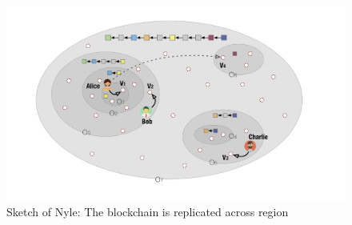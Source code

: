 \documentclass[a4paper,11pt,oneside]{report}
\begin{document}
\begin{figure}[!h]
\centering
\includegraphics[width=400pt]{figures/Nyle}
\caption{Sketch of Nyle: The blockchain is replicated across region}
\label{fig:Nyle}
\end{figure}
\end{document}
